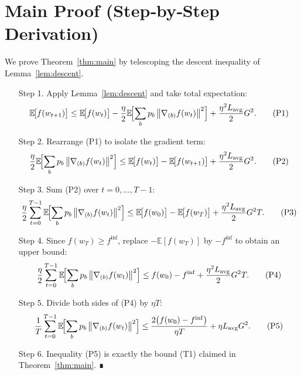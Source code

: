 \documentclass{article}
\newcommand{\E}{\mathbb{E}}
\newcommand{\norm}[1]{\left\|#1\right\|}
\newcommand{\grad}[1]{\nabla #1}
\begin{document}
\section*{Main Proof (Step‑by‑Step Derivation)}
We prove Theorem~\ref{thm:main} by telescoping the descent inequality of
Lemma~\ref{lem:descent}.

\begin{enumerate}
\item[Step 1.]  Apply Lemma~\ref{lem:descent} and take total expectation:
\[
\E\!\bigl[f(w_{t+1})\bigr]
\le \E\!\bigl[f(w_{t})\bigr]
-\frac{\eta}{2}\E\!\Bigl[\sum_{b}p_{b}\norm{\grad_{(b)}f(w_{t})}^{2}\Bigr]
+\frac{\eta^{2}L_{\mathrm{avg}}}{2}G^{2}.
\tag{P1}
\]

\item[Step 2.]  Rearrange (P1) to isolate the gradient term:
\[
\frac{\eta}{2}\E\!\Bigl[\sum_{b}p_{b}\norm{\grad_{(b)}f(w_{t})}^{2}\Bigr]
\le \E\!\bigl[f(w_{t})\bigr]-\E\!\bigl[f(w_{t+1})\bigr]
+\frac{\eta^{2}L_{\mathrm{avg}}}{2}G^{2}.
\tag{P2}
\]

\item[Step 3.]  Sum (P2) over $t=0,\dots ,T-1$:
\[
\frac{\eta}{2}\sum_{t=0}^{T-1}
\E\!\Bigl[\sum_{b}p_{b}\norm{\grad_{(b)}f(w_{t})}^{2}\Bigr]
\le \E\!\bigl[f(w_{0})\bigr]-\E\!\bigl[f(w_{T})\bigr]
+ \frac{\eta^{2}L_{\mathrm{avg}}}{2}G^{2}T.
\tag{P3}
\]

\item[Step 4.]  Since $f(w_{T})\ge f^{\inf}$, replace $-\E[f(w_{T})]$ by
$-f^{\inf}$ to obtain an upper bound:
\[
\frac{\eta}{2}\sum_{t=0}^{T-1}
\E\!\Bigl[\sum_{b}p_{b}\norm{\grad_{(b)}f(w_{t})}^{2}\Bigr]
\le f(w_{0})-f^{\inf}
+ \frac{\eta^{2}L_{\mathrm{avg}}}{2}G^{2}T.
\tag{P4}
\]

\item[Step 5.]  Divide both sides of (P4) by $\eta T$:
\[
\frac{1}{T}\sum_{t=0}^{T-1}
\E\!\Bigl[\sum_{b}p_{b}\norm{\grad_{(b)}f(w_{t})}^{2}\Bigr]
\le
\frac{2\bigl(f(w_{0})-f^{\inf}\bigr)}{\eta T}
+\eta L_{\mathrm{avg}} G^{2}.
\tag{P5}
\]

\item[Step 6.]  Inequality (P5) is exactly the bound (T1) claimed in
Theorem~\ref{thm:main}.  ∎
\end{enumerate}

\end{document}
